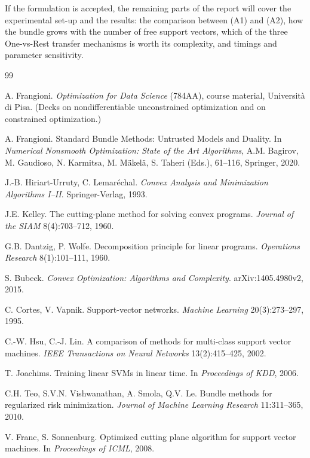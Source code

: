 \documentclass[11pt,a4paper]{report}
\begin{document}
If the formulation is accepted, the remaining parts of the report will cover the
experimental set-up and the results: the comparison between (A1) and (A2), how the
bundle grows with the number of free support vectors, which of the three One-vs-Rest
transfer mechanisms is worth its complexity, and timings and parameter sensitivity.

\begin{thebibliography}{99}

 A. Frangioni. \emph{Optimization for Data Science} (784AA),
course material, Universit\`a di Pisa. (Decks on nondifferentiable unconstrained
optimization and on constrained optimization.)

 A. Frangioni. Standard Bundle Methods: Untrusted Models and
Duality. In \emph{Numerical Nonsmooth Optimization: State of the Art Algorithms},
A.M. Bagirov, M. Gaudioso, N. Karmitsa, M. M\"akel\"a, S. Taheri (Eds.), 61--116,
Springer, 2020.

 J.-B. Hiriart-Urruty, C. Lemar\'echal. \emph{Convex Analysis and
Minimization Algorithms I--II}. Springer-Verlag, 1993.

 J.E. Kelley. The cutting-plane method for solving convex
programs. \emph{Journal of the SIAM} 8(4):703--712, 1960.

 G.B. Dantzig, P. Wolfe. Decomposition principle for linear programs.
\emph{Operations Research} 8(1):101--111, 1960.

 S. Bubeck. \emph{Convex Optimization: Algorithms and Complexity}.
arXiv:1405.4980v2, 2015.

 C. Cortes, V. Vapnik. Support-vector networks.
\emph{Machine Learning} 20(3):273--297, 1995.

 C.-W. Hsu, C.-J. Lin. A comparison of methods for multi-class
support vector machines. \emph{IEEE Transactions on Neural Networks}
13(2):415--425, 2002.

 T. Joachims. Training linear SVMs in linear time. In
\emph{Proceedings of KDD}, 2006.

 C.H. Teo, S.V.N. Vishwanathan, A. Smola, Q.V. Le. Bundle methods for
regularized risk minimization. \emph{Journal of Machine Learning Research}
11:311--365, 2010.

 V. Franc, S. Sonnenburg. Optimized cutting plane algorithm for
support vector machines. In \emph{Proceedings of ICML}, 2008.

\end{thebibliography}
\end{document}
